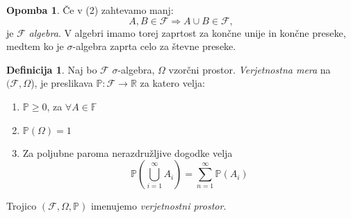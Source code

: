\documentclass[11pt]{article}
\theoremstyle{definition}
\newtheorem{definicija}{Definicija}[section]
\theoremstyle{definition}
\theoremstyle{definition}
\theoremstyle{theorem}
\theoremstyle{theorem}
\newtheorem*{opomba}{Opomba}
\begin{document}
\begin{opomba}

Če v (2) zahtevamo manj:
$$A, B \in \mathcal{F} \Rightarrow A \cup B \in \mathcal{F},$$
je $\mathcal{F}$ \textit{algebra}. V algebri imamo torej zaprtost za končne unije in končne preseke, medtem ko je $\sigma$-algebra zaprta celo za števne preseke.

\end{opomba}
\vspace{0.5cm}

\begin{definicija}
Naj bo $\mathcal{F}$ $\sigma$-algebra, $\Omega$ vzorčni prostor. \textit{Verjetnostna mera} na $(\mathcal{F}, \Omega$), je preslikava $\mathbb{P}: \mathcal{F} \rightarrow \mathbb{R}$ za katero velja:
\begin{enumerate}
	\item $\mathbb{P} \geq 0$, za $\forall A \in \mathbb{F}$
	\item $\mathbb{P}(\Omega) = 1$
	\item Za poljubne paroma nerazdružljive dogodke velja
	$$\mathbb{P}\left( \bigcup_{i=1}^{\infty} A_i \right) = \sum_{n=1}^{\infty} \mathbb{P}(A_i)$$
\end{enumerate}
Trojico $(\mathcal{F}, \Omega, \mathbb{P})$ imenujemo \textit{verjetnostni prostor}.
\end{definicija}
\vspace{0.5cm}
\end{document}
